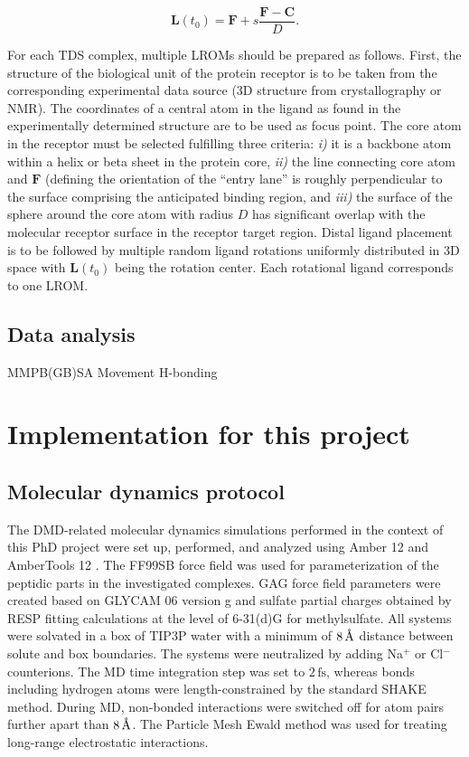 \begin{equation}
\bm{L}(t_0) = \bm{F} + s \frac{\bm{F}-\bm{C}}{D}.
\end{equation}

For each TDS complex, multiple LROMs should be prepared as follows. First, the
structure of the biological unit of the protein receptor is to be taken from the
corresponding experimental data source (3D structure from crystallography or
NMR). The coordinates of a central atom in the ligand as found in the
experimentally determined structure are to be used as focus point. The core atom
in the receptor must be selected fulfilling three criteria: \textit{i)} it is a
backbone atom within a helix or beta sheet in the protein core, \textit{ii)} the
line connecting core atom and $\bm{F}$ (defining the orientation of the ``entry
lane'' is roughly perpendicular to the surface comprising the anticipated
binding region, and \textit{iii)} the surface of the sphere around the core atom
with radius $D$ has significant overlap with the molecular receptor surface in
the receptor target region. Distal ligand placement is to be followed by
multiple random ligand rotations uniformly distributed in 3D space with
$\bm{L}(t_0)$ being the rotation center. Each rotational ligand corresponds to
one LROM.

\subsection{Data analysis}

            MMPB(GB)SA
            Movement
            H-bonding

\lipsum[1-2]



\section{Implementation for this project}

\subsection{Molecular dynamics protocol}

The DMD-related molecular dynamics simulations performed in the context of this
PhD project were set up, performed, and analyzed using Amber 12 and AmberTools
12 \cite{case_amber_11}. The FF99SB force field was used for parameterization of
the peptidic parts in the investigated complexes. GAG force field parameters
were created based on GLYCAM 06 version g \cite{kirschner_glycam06:_2008} and
sulfate partial charges obtained by RESP fitting calculations at the level of
6-31(d)G for methylsulfate. All systems were solvated in a box of TIP3P water
with a minimum of $8\,\textup{\AA}$ distance between solute and box boundaries. The
systems were neutralized by adding Na$^{+}$ or Cl$^{-}$ counterions. The MD time
integration step was set to $2\,\mathrm{fs}$, whereas bonds including hydrogen
atoms were length-constrained by the standard SHAKE method. During MD,
non-bonded interactions were switched off for atom pairs further apart than
$8\,\textup{\AA}$. The Particle Mesh Ewald method was used for treating long-range
electrostatic interactions.


